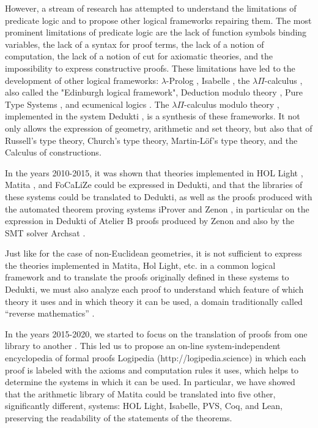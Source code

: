 However, a stream of research has attempted to understand the
limitations of predicate logic and to propose other logical frameworks
repairing them. The most prominent limitations of predicate logic are
the lack of function symbols binding variables, the lack of a syntax
for proof terms, the lack of a notion of computation, the lack of a
notion of cut for axiomatic theories, and the impossibility to express
constructive proofs. These limitations have led to the development of
other logical frameworks: $\lambda$-Prolog \cite{NadathurMiller88,
  MillerNadathur12}, Isabelle \cite{Paulson90}, the $\lambda
\Pi$-calculus \cite{HarperHonsellPlotkin91}, also called the
"Edinburgh logical framework", Deduction modulo theory
\cite{DowekHardinKirchner03, DowekWerner03}, Pure Type Systems
\cite{Berardi88,Terlouw89}, and ecumenical logics
\cite{Prawitz15,Dowek15,PereiraRodriguez17}. The $\lambda
\Pi$-calculus modulo theory \cite{CousineauDowek07}, implemented in
the system {\sc Dedukti} \cite{Assaf16}, is a synthesis of these
frameworks. It not only allows the expression of geometry, arithmetic
and set theory, but also that of Russell's type theory, Church's type
theory, Martin-L\"of's type theory, and the Calculus of constructions.

In the years 2010-2015, it was shown that theories implemented in {\sc
HOL Light} \cite{Assaf12}, {\sc Matita} \cite{Assaf15}, and {\sc
FoCaLiZe} \cite{Cauderlier16} could be expressed in {\sc Dedukti},
and that the libraries of these systems could be translated to {\sc
Dedukti}, as well as the proofs produced with the automated theorem
proving systems {\sc iProver} \cite{Burel10} and {\sc Zenon}
\cite{CauderlierHalmagrand15}, in particular on the expression in {\sc
  Dedukti} of {\sc Atelier B} proofs produced by {\sc Zenon} and also
by the SMT solver {\sc Archsat} \cite{Bury19}.

Just like for the case of non-Euclidean geometries, it is not
sufficient to express the theories implemented in {\sc Matita}, {\sc
  Hol Light}, etc.  in a common logical framework and to translate the
proofs originally defined in these systems to {\sc Dedukti}, we must
also analyze each proof to understand which feature of which theory it
uses and in which theory it can be used, a domain traditionally called
“reverse mathematics” \cite{Friedman76,Simpson09,Dowek17}.


In the years 2015-2020, we started to focus on the translation of
proofs from one library to another \cite{Dowek17,Thire18}. This led us
to propose an on-line system-independent encyclopedia of formal proofs
Logipedia (http://logipedia.science) in which each proof is labeled
with the axioms and computation rules it uses, which helps to
determine the systems in which it can be used. In particular, we have
showed that the arithmetic library of {\sc Matita} could be translated
into five other, significantly different, systems: {\sc HOL Light},
{\sc Isabelle}, {\sc PVS}, {\sc Coq}, and {\sc Lean}, preserving
the readability of the statements of the theorems.

